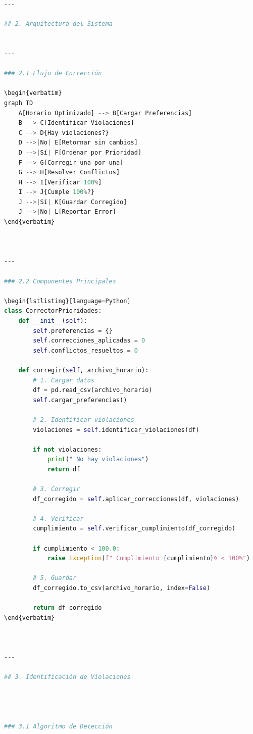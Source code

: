 \begin{itemize}
\begin{itemize}
\begin{itemize}
\begin{itemize}
\begin{itemize}
\begin{itemize}
\begin{enumerate}
\begin{enumerate}
\begin{enumerate}
\begin{enumerate}
\begin{lstlisting}[language=Python]
---

## 2. Arquitectura del Sistema


---

### 2.1 Flujo de Corrección

\begin{verbatim}
graph TD
    A[Horario Optimizado] --> B[Cargar Preferencias]
    B --> C[Identificar Violaciones]
    C --> D{Hay violaciones?}
    D -->|No| E[Retornar sin cambios]
    D -->|Sí| F[Ordenar por Prioridad]
    F --> G[Corregir una por una]
    G --> H[Resolver Conflictos]
    H --> I[Verificar 100%]
    I --> J{Cumple 100%?}
    J -->|Sí| K[Guardar Corregido]
    J -->|No| L[Reportar Error]
\end{verbatim}



---

### 2.2 Componentes Principales

\begin{lstlisting}[language=Python]
class CorrectorPrioridades:
    def __init__(self):
        self.preferencias = {}
        self.correcciones_aplicadas = 0
        self.conflictos_resueltos = 0
    
    def corregir(self, archivo_horario):
        # 1. Cargar datos
        df = pd.read_csv(archivo_horario)
        self.cargar_preferencias()
        
        # 2. Identificar violaciones
        violaciones = self.identificar_violaciones(df)
        
        if not violaciones:
            print(" No hay violaciones")
            return df
        
        # 3. Corregir
        df_corregido = self.aplicar_correcciones(df, violaciones)
        
        # 4. Verificar
        cumplimiento = self.verificar_cumplimiento(df_corregido)
        
        if cumplimiento < 100.0:
            raise Exception(f" Cumplimiento {cumplimiento}% < 100%")
        
        # 5. Guardar
        df_corregido.to_csv(archivo_horario, index=False)
        
        return df_corregido
\end{verbatim}



---

## 3. Identificación de Violaciones


---

### 3.1 Algoritmo de Detección


\end{lstlisting}
\end{enumerate}
\end{enumerate}
\end{enumerate}
\end{enumerate}
\end{itemize}
\end{itemize}
\end{itemize}
\end{itemize}
\end{itemize}
\end{itemize}

